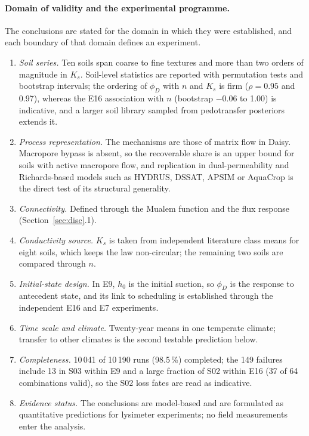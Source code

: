 \documentclass[preprint,12pt,authoryear]{elsarticle}
\begin{document}
\paragraph{Domain of validity and the experimental programme.}
The conclusions are stated for the domain in which they were established, and each boundary of that domain defines an experiment.
\begin{enumerate}[nosep]
\item \emph{Soil series.} Ten soils span coarse to fine textures and more than two orders of magnitude in $K_s$. Soil-level statistics are reported with permutation tests and bootstrap intervals; the ordering of $\phi_D$ with $n$ and $K_s$ is firm ($\rho=0.95$ and 0.97), whereas the E16 association with $n$ (bootstrap $-0.06$ to 1.00) is indicative, and a larger soil library sampled from pedotransfer posteriors extends it.
\item \emph{Process representation.} The mechanisms are those of matrix flow in Daisy. Macropore bypass \citep{Jarvis2007,Beven1982} is absent, so the recoverable share is an upper bound for soils with active macropore flow, and replication in dual-permeability and Richards-based models such as HYDRUS, DSSAT, APSIM or AquaCrop \citep{Simunek2008,Simunek2016,Jones2003,Keating2003,Steduto2009} is the direct test of its structural generality.
\item \emph{Connectivity.} Defined through the Mualem function and the flux response (Section~\ref{sec:disc}.1).
\item \emph{Conductivity source.} $K_s$ is taken from independent literature class means for eight soils, which keeps the law non-circular; the remaining two soils are compared through $n$.
\item \emph{Initial-state design.} In E9, $h_0$ is the initial suction, so $\phi_D$ is the response to antecedent state, and its link to scheduling is established through the independent E16 and E7 experiments.
\item \emph{Time scale and climate.} Twenty-year means in one temperate climate; transfer to other climates is the second testable prediction below.
\item \emph{Completeness.} 10\,041 of 10\,190 runs (98.5\,\%) completed; the 149 failures include 13 in S03 within E9 and a large fraction of S02 within E16 (37 of 64 combinations valid), so the S02 loss fates are read as indicative.
\item \emph{Evidence status.} The conclusions are model-based and are formulated as quantitative predictions for lysimeter experiments; no field measurements enter the analysis.
\end{enumerate}
\end{document}

